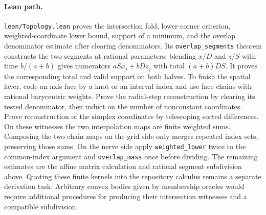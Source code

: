 \paragraph{Lean path.}
\texttt{lean/Topology.lean} proves the intersection fold, lower-corner
criterion, weighted-coordinate lower bound, support of a minimum, and
the overlap denominator estimate after clearing denominators. Its
\texttt{overlap\_segments} theorem constructs the two segments at rational
parameters: blending $x/D$ and $z/S$ with time $b/(a+b)$ gives numerators
$aS x_j+bD z_j$ with total $(a+b)DS$. It proves the corresponding total
and valid support on both halves.
To finish the spatial layer, code an axis face by a knot or an interval
index and use face chains with rational barycentric weights. Prove the
radial-step reconstruction by clearing its tested denominator, then
induct on the number of nonconstant coordinates. Prove reconstruction
of the simplex coordinates by telescoping sorted differences. On these
witnesses the two interpolation maps are finite weighted sums.
Composing the two chain maps on the grid side only merges repeated
index sets, preserving those sums. On the nerve side apply
\texttt{weighted\_lower} twice to the common-index argument and
\texttt{overlap\_mass} once before dividing. The remaining estimates are
the affine matrix calculation and rational segment subdivision above.
Quoting these finite kernels into the repository calculus remains a
separate derivation task. Arbitrary convex bodies given by membership
oracles would require additional procedures for producing their
intersection witnesses and a compatible subdivision.
